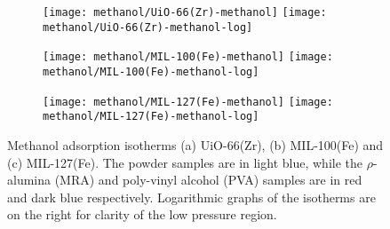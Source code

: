 \begin{figure}[p!]
    \centering

    \begin{subfigure}{\linewidth}
        \centering
        \parbox{0.1\linewidth}{\caption{}\label{shaping:fgr:methanoluio66}}%
        \texttt{[image: methanol/UiO-66(Zr)-methanol]}%
        \texttt{[image: methanol/UiO-66(Zr)-methanol-log]}%
    \end{subfigure}%

    \begin{subfigure}{\linewidth}
        \centering
        \parbox{0.1\linewidth}{\caption{}\label{shaping:fgr:methanolmil100}}%
        \texttt{[image: methanol/MIL-100(Fe)-methanol]}%
        \texttt{[image: methanol/MIL-100(Fe)-methanol-log]}%
    \end{subfigure}%

    \begin{subfigure}{\linewidth}
        \centering
        \parbox{0.1\linewidth}{\caption{}\label{shaping:fgr:methanolmil127}}%
        \texttt{[image: methanol/MIL-127(Fe)-methanol]}%
        \texttt{[image: methanol/MIL-127(Fe)-methanol-log]}%
    \end{subfigure}%
    
    \caption{Methanol adsorption isotherms (a) UiO-66(Zr), 
    (b) MIL-100(Fe) and (c) MIL-127(Fe). The powder samples are in light
    blue, while the \(\rho\)-alumina (MRA) and poly-vinyl alcohol 
    (PVA) samples are in red and dark blue respectively. Logarithmic 
    graphs of the isotherms are on the right for clarity of the low
    pressure region.}%
    \label{shaping:fgr:methanoladsorption}
\end{figure}